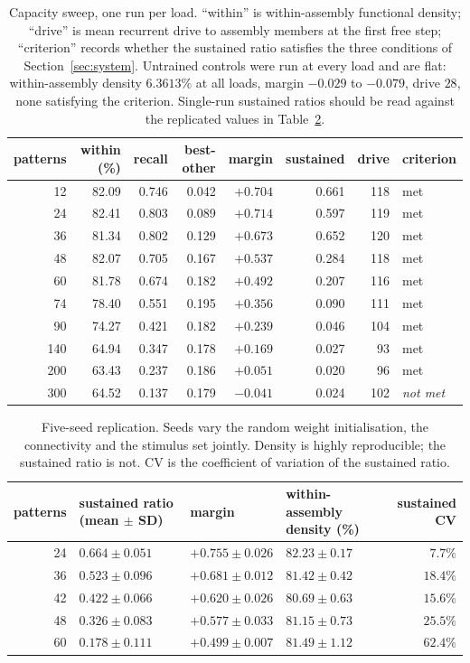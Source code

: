 \documentclass[10pt,twocolumn,a4paper]{article}
\newcommand{\pct}{\%}
\begin{document}
\begin{table}[!t]
\centering
\caption{Capacity sweep, one run per load. ``within'' is within-assembly functional
density; ``drive'' is mean recurrent drive to assembly members at the first free step;
``criterion'' records whether the sustained ratio satisfies the three conditions of
Section~\ref{sec:system}. Untrained controls were run at every load and are flat:
within-assembly density $6.3613\pct$ at all loads, margin $-0.029$ to $-0.079$, drive
$28$, none satisfying the criterion. Single-run sustained ratios should be read against
the replicated values in Table~\ref{tab:seeds}.}
\label{tab:capacity}
\small
\begin{tabular}{rrrrrrrl}
\toprule
patterns & within (\pct) & recall & best-other & margin & sustained & drive & criterion \\
\midrule
12  & 82.09 & 0.746 & 0.042 & $+0.704$ & 0.661 & 118 & met \\
24  & 82.41 & 0.803 & 0.089 & $+0.714$ & 0.597 & 119 & met \\
36  & 81.34 & 0.802 & 0.129 & $+0.673$ & 0.652 & 120 & met \\
48  & 82.07 & 0.705 & 0.167 & $+0.537$ & 0.284 & 118 & met \\
60  & 81.78 & 0.674 & 0.182 & $+0.492$ & 0.207 & 116 & met \\
74  & 78.40 & 0.551 & 0.195 & $+0.356$ & 0.090 & 111 & met \\
90  & 74.27 & 0.421 & 0.182 & $+0.239$ & 0.046 & 104 & met \\
140 & 64.94 & 0.347 & 0.178 & $+0.169$ & 0.027 & 93  & met \\
200 & 63.43 & 0.237 & 0.186 & $+0.051$ & 0.020 & 96  & met \\
300 & 64.52 & 0.137 & 0.179 & $-0.041$ & 0.024 & 102 & \emph{not met} \\
\bottomrule
\end{tabular}
\end{table}

\begin{table}[!t]
\centering
\caption{Five-seed replication. Seeds vary the random weight initialisation, the
connectivity and the stimulus set jointly. Density is highly reproducible; the sustained
ratio is not. CV is the coefficient of variation of the sustained ratio.}
\label{tab:seeds}
\small
\begin{tabular}{rlllr}
\toprule
patterns & sustained ratio (mean $\pm$ SD) & margin & within-assembly density (\pct) & sustained CV \\
\midrule
24 & $0.664 \pm 0.051$ & $+0.755 \pm 0.026$ & $82.23 \pm 0.17$ & $7.7\pct$ \\
36 & $0.523 \pm 0.096$ & $+0.681 \pm 0.012$ & $81.42 \pm 0.42$ & $18.4\pct$ \\
42 & $0.422 \pm 0.066$ & $+0.620 \pm 0.026$ & $80.69 \pm 0.63$ & $15.6\pct$ \\
48 & $0.326 \pm 0.083$ & $+0.577 \pm 0.033$ & $81.15 \pm 0.73$ & $25.5\pct$ \\
60 & $0.178 \pm 0.111$ & $+0.499 \pm 0.007$ & $81.49 \pm 1.12$ & $62.4\pct$ \\
\bottomrule
\end{tabular}
\end{table}
\end{document}
